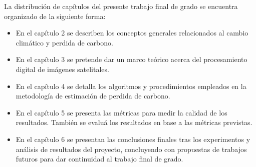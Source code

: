 La distribución de capítulos del presente trabajo final de grado se encuentra organizado de la siguiente forma:
\begin{itemize}

\item En el cap\'itulo 2  se describen los conceptos generales relacionados al cambio clim\'atico y perdida de carbono.

\item En el cap\'itulo 3 se pretende dar un marco te\'orico acerca del procesamiento digital de im\'agenes satelitales.
\item En el cap\'itulo 4  se detalla los algoritmos y procedimientos empleados en la metodolog\'ia de estimaci\'on de perdida de carbono.

\item En el cap\'itulo 5  se presenta las m\'etricas para medir la calidad de los resultados. Tambi\'en se evalu\'a los resultados en base a las m\'etricas previstas.

\item En el cap\'itulo 6 se presentan las conclusiones finales tras los experimentos y an\'alisis de resultados del proyecto, concluyendo con propuestas de trabajos futuros para dar continuidad al trabajo final de grado.

\end{itemize}

